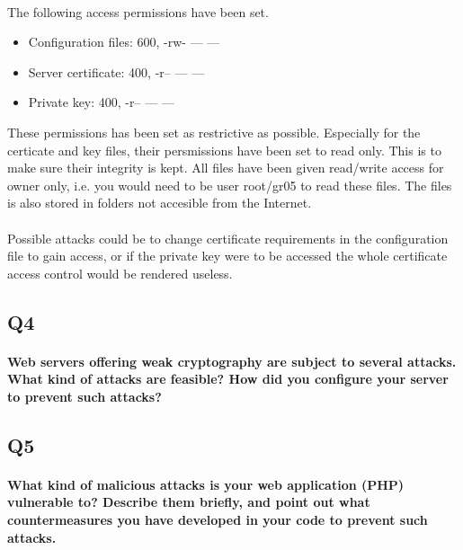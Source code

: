 \documentclass[a4paper,11pt]{article}
\begin{document}
\paragraph{}The following access permissions have been set.
\begin{itemize}
	\item Configuration files: 600, -rw- --- ---
	\item Server certificate: 400, -r-- --- ---
	\item Private key: 400, -r-- --- ---
\end{itemize}
These permissions has been set as restrictive as possible. Especially for the certicate and key files, their persmissions have been set to read only. This is to make sure their integrity is kept. All files have been given read/write access for owner only, i.e. you would need to be user root/gr05 to read these files. The files is also stored in folders not accesible from the Internet.
\paragraph{}Possible attacks could be to change certificate requirements in the configuration file to gain access, or if the private key were to be accessed the whole certificate access control would be rendered useless.
\subsection{Q4}
\paragraph{Web servers offering weak cryptography are subject to several attacks. What kind of attacks are feasible? How did you conﬁgure your server to prevent such attacks?}
\subsection{Q5}
\paragraph{What kind of malicious attacks is your web application (PHP) vulnerable to? Describe
them brieﬂy, and point out what countermeasures you have developed in your code to prevent
such attacks.}
\end{document}
